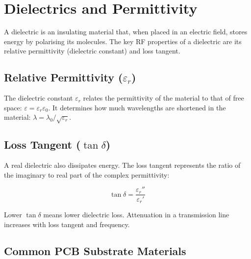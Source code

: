 \section{Dielectrics and Permittivity}\label{sec:wiki_dielectrics}



A dielectric is an insulating material that, when placed in an electric field, stores energy by polarising its molecules. The key RF properties of a dielectric are its relative permittivity (dielectric constant) and loss tangent.

				

\subsection{Relative Permittivity ($\varepsilon_r$)}

				

The dielectric constant $\varepsilon_r$ relates the permittivity of the material to that of free space: $\varepsilon = \varepsilon_r\varepsilon_0$. It determines how much wavelengths are shortened in the material: $\lambda = \lambda_0/\sqrt{\varepsilon_r}$.


				

\subsection{Loss Tangent ($\tan\delta$)}

				

A real dielectric also dissipates energy. The loss tangent represents the ratio of the imaginary to real part of the complex permittivity:

				
\[\tan\delta = \dfrac{\varepsilon_r''}{\varepsilon_r'}\]

				

Lower $\tan\delta$ means lower dielectric loss. Attenuation in a transmission line increases with loss tangent and frequency.

				

\subsection{Common PCB Substrate Materials}

				

